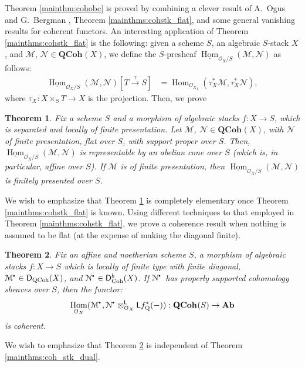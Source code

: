 \documentclass{amsart}
\theoremstyle{plain}
\newtheorem{mainthm}{Theorem}
\theoremstyle{definition}
\theoremstyle{remark}
\numberwithin{equation}{section}
\newcommand{\Orb}{\mathcal{O}}
\newcommand{\QCOHB}{\mathbf{QCoh}}
\newcommand{\QCOH}[2][]{\QCOHB^{#1}({#2})}
\newcommand{\Homstk}{\underline{\Hom}}
\DeclareMathOperator{\Hom}{Hom}
\newcommand{\LDERF}{\mathsf{L}}
\newcommand{\DCAT}{\mathsf{D}}
\newcommand{\tensor}{\otimes}
\newcommand{\AB}{\mathbf{Ab}}
\newcommand{\shv}[1]{\mathcal{{#1}}}
\newcommand{\QCPBK}[1]{{#1}_{\mathrm{Q}}^*}
\newcommand{\DQCOH}{\DCAT_{\mathrm{QCoh}}}
\newcommand{\DCOH}{\DCAT_{\mathrm{Coh}}}
\newcommand{\sbt}{\,\begin{picture}(-1,-1)(0,-2)\circle*{1.5}\end{picture}\ }
\newcommand{\cplx}[1]{\shv{{#1}}^{\sbt}}
\begin{document}
Theorem \ref{mainthm:cohobc} is proved by combining a clever
result of A.~Ogus and G.~Bergman \cite[Cor.~5.1]{MR0302633},
Theorem \ref{mainthms:cohstk_flat}, and some general vanishing results
for coherent functors. An interesting application of Theorem
\ref{mainthms:cohstk_flat} is the following:
given a scheme $S$, an algebraic $S$-stack $X$, and $\shv{M}$, $\shv{N}
\in \QCOH{X}$, we define the $S$-presheaf
$\Homstk_{\Orb_{X}/S}(\shv{M},\shv{N})$ as follows:
\begin{align*}
  \Homstk_{\Orb_X/S}(\shv{M},\shv{N})[T\xrightarrow{\tau} S] &=
  \Hom_{\Orb_{X_T}}(\tau_X^*\shv{M},\tau_X^*\shv{N}),
\end{align*}
where $\tau_X : X \times_S T \to X$ is the projection. Then, we prove
\begin{mainthm}\label{mainthms:bdd_hom_shf}
  Fix a scheme $S$ and a morphism of algebraic stacks $f :X \to S$, which
  is separated and locally of finite presentation. Let $\shv{M}$,
  $\shv{N} \in \QCOH{X}$, with $\shv{N}$ of finite presentation, flat
  over $S$, with support proper over $S$. Then,
  $\Homstk_{\Orb_X/S}(\shv{M},\shv{N})$ is  
  representable by an abelian cone over $S$ (which is, in particular,
  affine over $S$). If $\shv{M}$ is of finite presentation, then 
  $\Homstk_{\Orb_X/S}(\shv{M},\shv{N})$ is finitely presented over $S$. 
\end{mainthm}
We wish to emphasize that Theorem \ref{mainthms:bdd_hom_shf} is
completely elementary once Theorem \ref{mainthms:cohstk_flat} is
known. Using different techniques to that employed in Theorem
\ref{mainthms:cohstk_flat}, we prove a coherence result when nothing
is assumed to be flat (at the expense of making the diagonal finite). 
\begin{mainthm}\label{mainthms:cohstk_noeth_fd}
  Fix an affine and noetherian scheme $S$, a morphism of algebraic
  stacks $f : X \to S$ which is locally of finite type with finite
  diagonal, $\cplx{M} \in \DQCOH(X)$, and $\cplx{N}
  \in \DCOH^b(X)$. If $\cplx{N}$ has properly supported cohomology sheaves 
  over $S$, then the functor: 
  \[
  \Hom_{\Orb_X}(\cplx{M},\cplx{N}
  \tensor_{\Orb_X}^\LDERF \LDERF \QCPBK{f}(-)) : \QCOH{S} \to \AB
  \]
  is coherent. 
\end{mainthm}
We wish to emphasize that Theorem \ref{mainthms:cohstk_noeth_fd} is
 independent of Theorem \ref{mainthms:coh_stk_dual}.
\end{document}
